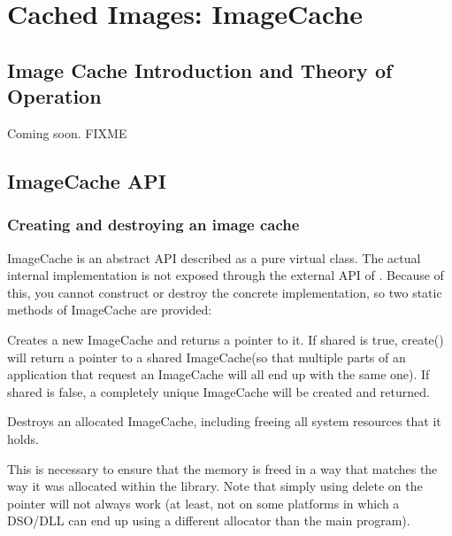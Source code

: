 \chapter{Cached Images: {\cf ImageCache}}
\label{chap:imagecache}

\def\ImageCache{{\cf ImageCache}\xspace}


\section{Image Cache Introduction and Theory of Operation}
\label{sec:imagecache:intro}

Coming soon.
FIXME

\section{ImageCache API}
\label{sec:imagecache:api}

\subsection{Creating and destroying an image cache}
\label{sec:imagecache:api:createdestroy}

\ImageCache is an abstract API described as a pure virtual class.  The
actual internal implementation is not exposed through the external API
of \product.  Because of this, you cannot construct or destroy the
concrete implementation, so two static methods of \ImageCache are
provided:


Creates a new \ImageCache and returns a pointer to it.  If 
{\cf shared} is {\cf true}, {\cf create()} will return a pointer
to a shared \ImageCache (so that multiple parts of an application
that request an \ImageCache will all end up with the same one).
If {\cf shared} is {\cf false}, a completely unique \ImageCache
will be created and returned.

\apiend

Destroys an allocated \ImageCache, including freeing all system
resources that it holds.

This is necessary to ensure that the memory is freed in a way that
matches the way it was allocated within the library.  Note that simply
using {\cf delete} on the pointer will not always work (at least,
not on some platforms in which a DSO/DLL can end up using a different
allocator than the main program).


